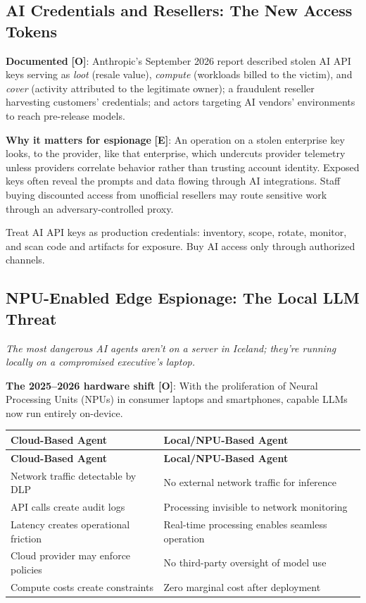 \documentclass[11pt,letterpaper]{article}
\begin{document}
\subsection{AI Credentials and Resellers: The New Access Tokens}

\textbf{Documented} \textbf{[O]}: Anthropic's September 2026 report described stolen AI API keys serving as \textit{loot} (resale value), \textit{compute} (workloads billed to the victim), and \textit{cover} (activity attributed to the legitimate owner); a fraudulent reseller harvesting customers' credentials; and actors targeting AI vendors' environments to reach pre-release models.

\textbf{Why it matters for espionage} \textbf{[E]}: An operation on a stolen enterprise key looks, to the provider, like that enterprise, which undercuts provider telemetry unless providers correlate behavior rather than trusting account identity. Exposed keys often reveal the prompts and data flowing through AI integrations. Staff buying discounted access from unofficial resellers may route sensitive work through an adversary-controlled proxy.

\begin{recbox}
Treat AI API keys as production credentials: inventory, scope, rotate, monitor, and scan code and artifacts for exposure. Buy AI access only through authorized channels.
\end{recbox}

\subsection{NPU-Enabled Edge Espionage: The Local LLM Threat}

\textit{The most dangerous AI agents aren't on a server in Iceland; they're running locally on a compromised executive's laptop.}

\textbf{The 2025--2026 hardware shift} \textbf{[O]}: With the proliferation of Neural Processing Units (NPUs) in consumer laptops and smartphones, capable LLMs now run entirely on-device.

{\small
\begin{longtable}{L{4.5cm}L{7.5cm}}
\toprule
\textbf{Cloud-Based Agent} & \textbf{Local/NPU-Based Agent} \\
\midrule
\endfirsthead
\toprule
\textbf{Cloud-Based Agent} & \textbf{Local/NPU-Based Agent} \\
\midrule
\endhead
Network traffic detectable by DLP & No external network traffic for inference \\*
API calls create audit logs & Processing invisible to network monitoring \\
Latency creates operational friction & Real-time processing enables seamless operation \\
Cloud provider may enforce policies & No third-party oversight of model use \\*
Compute costs create constraints & Zero marginal cost after deployment \\
\bottomrule
\end{longtable}}
\end{document}
